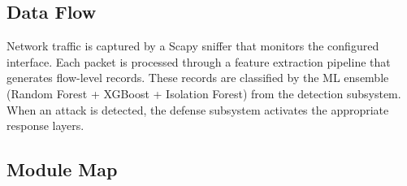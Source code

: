 \documentclass[12pt,a4paper]{article}
\begin{document}
\subsection{Data Flow}

Network traffic is captured by a Scapy sniffer that monitors the configured interface. Each packet is processed through a feature extraction pipeline that generates flow-level records. These records are classified by the ML ensemble (Random Forest + XGBoost + Isolation Forest) from the detection subsystem. When an attack is detected, the defense subsystem activates the appropriate response layers.

\subsection{Module Map}
\end{document}
